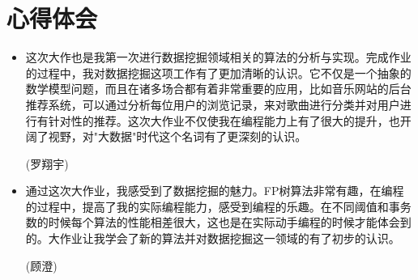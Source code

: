 \documentclass[a4paper,9pt]{article}
\begin{document}
\section{心得体会}

\begin{itemize}
	\item{} 这次大作也是我第一次进行数据挖掘领域相关的算法的分析与实现。完成作业的过程中，我对数据挖掘这项工作有了更加清晰的认识。它不仅是一个抽象的数学模型问题，而且在诸多场合都有着非常重要的应用，比如音乐网站的后台推荐系统，可以通过分析每位用户的浏览记录，来对歌曲进行分类并对用户进行有针对性的推荐。这次大作业不仅使我在编程能力上有了很大的提升，也开阔了视野，对"大数据"时代这个名词有了更深刻的认识。

		(罗翔宇)
	\item {} 通过这次大作业，我感受到了数据挖掘的魅力。FP树算法非常有趣，在编程的过程中，提高了我的实际编程能力，感受到编程的乐趣。在不同阈值和事务数的时候每个算法的性能相差很大，这也是在实际动手编程的时候才能体会到的。大作业让我学会了新的算法并对数据挖掘这一领域的有了初步的认识。

		(顾澄)
\end{itemize}
\end{document}
